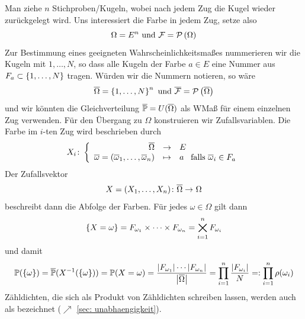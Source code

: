 Man ziehe $n$ Stichproben/Kugeln, wobei nach jedem Zug die Kugel wieder zurückgelegt wird. Uns interessiert die Farbe in jedem Zug, setze also
\begin{equation*}
	\Omega = E^n \text{ und } \mathcal{F} = \mathcal{P}\left( \Omega \right) 
\end{equation*}
Zur Bestimmung eines geeigneten Wahrscheinlichkeitsmaßes nummerieren wir die Kugeln mit $1,\dots, N$, so dass alle Kugeln der Farbe $a \in E$ eine Nummer aus $F_{a} \subset \left\{ 1,\dots, N \right\}$ tragen. Würden wir die Nummern notieren, so wäre
\begin{equation*}
	\overline{\Omega} = \left\{ 1,\dots, N \right\}^n \text{ und } \overline{\mathcal{F}} = \mathcal{P}\left( \overline{\Omega} \right)
\end{equation*}
und wir könnten die Gleichverteilung $\overline{\mathbb{P}} = U(\overline{\Omega})$ als WMaß für einem einzelnen Zug verwenden. Für den Übergang zu $\Omega$ konstruieren wir  Zufallsvariablen. Die Farbe im $i$-ten Zug wird beschrieben durch
\begin{equation*}
	X_i \colon \left\lbrace \begin{array}{rcl} \overline{\Omega} & \to & E \\\overline{\omega} = \left( \overline{\omega}_1, \dots, \overline{\omega}_n \right) & \mapsto & a \enskip \text{ falls } \overline{\omega}_i \in F_a \end{array} \right.
\end{equation*}
Der Zufallsvektor
\begin{equation*}
	\abb{X = (X_1, \dots, X_n)}{\quer{\Omega}}{\Omega}
\end{equation*}
beschreibt dann die Abfolge der Farben. Für jedes $\omega \in \Omega$ gilt dann
\begin{equation*}
	\left\{ X = \omega \right\} = F_{\omega_1} \times \cdots \times F_{\omega_n} = \bigtimes_{i=1}^{n} F_{\omega_i}
\end{equation*}
und damit
\begin{equation*}
    \mathbb{P}(\left\{ \omega \right\}) 
    = \overline{\mathbb{P}}(X^{-1}(\left\{ \omega \right\})) = \mathbb{P}(X=\omega)
    = \frac{\left| F_{\omega_1} \right| \cdots \left| F_{\omega_n} \right|}{\left| \overline{\Omega} \right|}
    = \prod_{i=1}^{n} \frac{\left| F_{\omega_i} \right|}{N} 
    \mathrel{=:} \prod_{i=1}^{n} \rho(\omega_i)
\end{equation*}
Zähldichten, die sich als Produkt von Zähldichten schreiben lassen, werden auch als  bezeichnet ($\nearrow$  \cref{sec: unabhaengigkeit}).

